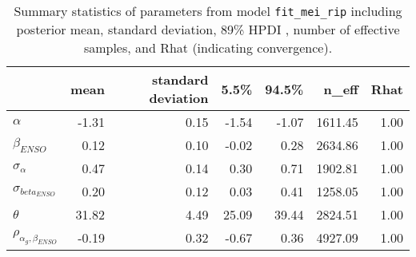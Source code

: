 \begin{table}[ht]
\centering
\begin{tabular}{lrrrrrr}
  \hline
 & mean & standard deviation & 5.5\% & 94.5\% & n\_eff & Rhat \\ 
  \hline
$\alpha$ & -1.31 & 0.15 & -1.54 & -1.07 & 1611.45 & 1.00 \\ 
  $\beta_{ENSO}$ & 0.12 & 0.10 & -0.02 & 0.28 & 2634.86 & 1.00 \\ 
  $\sigma_{\alpha}$ & 0.47 & 0.14 & 0.30 & 0.71 & 1902.81 & 1.00 \\ 
  $\sigma_{beta_{ENSO}}$ & 0.20 & 0.12 & 0.03 & 0.41 & 1258.05 & 1.00 \\ 
  $\theta$ & 31.82 & 4.49 & 25.09 & 39.44 & 2824.51 & 1.00 \\ 
  $\rho_{\alpha_g,\beta_{ENSO}}$ & -0.19 & 0.32 & -0.67 & 0.36 & 4927.09 & 1.00 \\ 
   \hline
\end{tabular}
\caption{Summary statistics of parameters from model \texttt{fit\_mei\_rip} including posterior mean, standard deviation, 89\% HPDI , number of effective samples, and Rhat (indicating convergence).} 
\label{tab:precis_mei_rip_me}
\end{table}
